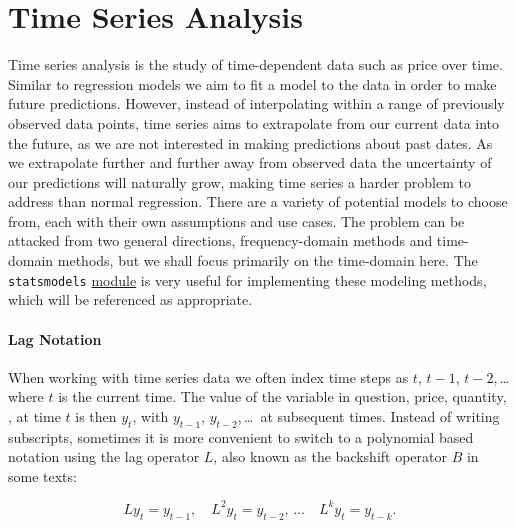 \chapter{Time Series Analysis}
\label{chap:time_series}

Time series analysis is the study of time-dependent data such as price over time.
Similar to regression models we aim to fit a model
to the data in order to make future predictions.
However, instead of interpolating within a range of previously observed data points,
time series aims to extrapolate from our current data into the future,
as we are not interested in making predictions about past dates.
As we extrapolate further and further away from observed data
the uncertainty of our predictions will naturally grow,
making time series a harder problem to address than normal regression.
There are a variety of potential models to choose from,
each with their own assumptions and use cases.
The problem can be attacked from two general directions,
frequency-domain methods and time-domain methods,
but we shall focus primarily on the time-domain here.
The \texttt{statsmodels} \python \href{https://www.statsmodels.org}{module}
is very useful for implementing these modeling methods,
which will be referenced as appropriate.

\subsubsection{Lag Notation}
\label{time_series:L}

When working with time series data we often index time steps as $t$, $t-1$, $t-2$,\,\ldots\,
where $t$ is the current time.
The value of the variable in question, price, quantity, \etc,
at time $t$ is then $y_{t}$, with $y_{t-1}$, $y_{t-2}$,\,\ldots\, at subsequent times.
Instead of writing subscripts, sometimes it is more convenient
to switch to a polynomial based notation using
the lag operator $L$, also known as the backshift operator $B$ in some texts:

\begin{equation}\label{eq:time_series:L}
L y_{t} = y_{t-1},\quad L^{2} y_{t} = y_{t-2},\,\ldots \quad L^{k} y_{t} = y_{t-k}.
\end{equation}

